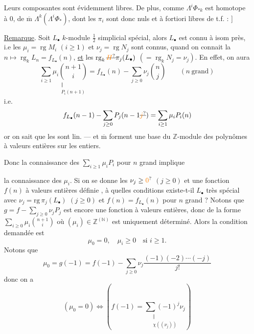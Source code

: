 Leurs composantes sont évidemment libres. De plus, comme $\Lambda^i\Phi_{*k}$ est homotope à $0$, de $\overline{\mathrm m}$ $\Lambda^k(\Lambda^i\Phi_*)$, dont les $\pi_i$ sont donc nuls et à fortiori libres de t.f. :
\hfill $]$

\uline{Remarque}. Soit $L_{\bullet}$ $k$-module $\frac12$ simplicial  spécial, alors $L_{\bullet}$ est connu à isom près, i.e les $\mu_i=\operatorname{rg}M_i$ $(i\geq1)$ et $\nu_j=\operatorname{rg}N_j$  sont connus, quand on connait la   $n\longmapsto\operatorname{rg}_k L_n=f_{L_{\bullet}}(n)$,  \uline{et} les $\operatorname{rg}_k\deleted{\unsure{H}}\pi_j(L_{\bullet})$ $(=\operatorname{rg}_k N_j=\nu_j)$. En effet, on aura
\[
\sum_{i\geq1}\mu_i\underset{\substack{\Vert\\P_i(n+1)}}{\binom{n+1}i}
=f_{L_{\bullet}}(n)-\sum_{j\geq0}\nu_j\binom n j
\qquad(n\ \text{grand})
\]
 i.e.
\[
f_{L_{\bullet}}(n-1)-\sum_{j\geq0}P_j(n-1\deleted{\unsure{j}})=\sum_{i\geq1}\mu_i P_i(n)
\]
or on sait que les   sont  lin.  --- et $\overline{\mathrm m}$ forment une base du $\mathbb Z$-module des polynômes à  valeurs entières sur les entiers.

Donc la connaissance des $\sum_{i\geq1}\mu_iP_i$ pour $n$ grand implique

la connaissance des $\mu_i$. Si on se donne les  $\nu_j\geq\unsure{0}$   $(j\geq0)$ et une fonction  $f(n)$ à valeurs entières définie  , à quelles conditions existe-t-il $L_\bullet$ très spécial avec $\nu_j=\mathrm{rg}\,\pi_j(L_\bullet)$ $(j\geq0)$ et $f(n)=f_{L_\bullet}(n)$ pour $n$ grand ? Notons que $g=f-\sum_{j\geq0}\nu_jP_j$ est encore une fonction   à valeurs entières, donc de la forme $\sum_{i\geq0}\mu_i\binom{n+1}{i}$ où $(\mu_i)\in\mathbb Z^{(\mathbb N)}$ est uniquement déterminé. Alors la condition demandée est
\[
\mu_0=0,\quad\mu_i\geq0\quad\text{si }i\geq1.
\]
Notons que 
\[
\mu_0=g(-1)=f(-1)-\sum_{j\geq0}\nu_j\frac{(-1)(-2)\cdots(-j)}{j!}
\]
donc on a 
\[
(\mu_0=0)\Longleftrightarrow\left(f(-1)=\underset{\substack{\Vert\\\chi((\nu_j))}}{\sum(-1)^j\nu_j}\right)
\]


